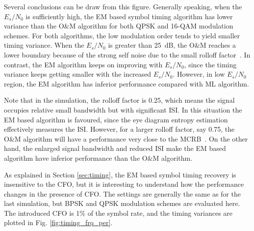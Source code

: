 \documentclass[journal,comsoc,onecolumn, 12pt,draftclsnofoot]{IEEEtran}
\begin{document}
Several conclusions can be draw from this figure.
Generally speaking, when the  \(E_s/N_0\) is sufficiently high, the EM based symbol timing algorithm has lower variance than the O\&M algorithm for both QPSK and 16-QAM modulation schemes.
For both algorithms, the low modulation order tends to yield smaller timing variance.
When the \(E_s/N_0\) is greater than 25~dB, the O\&M reaches a lower boundary because of the strong self noise due to the small rolloff factor~\cite{mengali1997synchronization}. 
% 
% 
In contrast, the EM algorithm keeps on improving with \(E_s/N_0\), since the timing variance keeps getting smaller with the increased \(E_s/N_0\).
However, in low \(E_s/N_0\) region, the EM algorithm has inferior performance compared with ML algorithm.


Note that in the simulation, the rolloff factor is 0.25, which means the signal occupies relative small bandwidth but with significant ISI.
In this situation the EM based algorithm is favoured, since the eye diagram entropy estimation effectively measures the ISI.
However, for a larger rolloff factor, say 0.75, the O\&M algorithm will have a performance very close to the MCRB~\cite{mengali1997synchronization}.
% 
% 
On the other hand, the enlarged signal bandwidth and reduced ISI make the EM based algorithm have inferior performance than the O\&M algorithm.

As explained in Section \ref{sec:timing}, the EM based symbol timing recovery is insensitive to the CFO, but it is interesting to understand how the performance changes in the presence of CFO. 
The settings are generally the same as for the last simulation, but BPSK and QPSK modulation schemes are evaluated here.
The introduced CFO is 1\% of the symbol rate, and the timing variances are plotted in Fig. \ref{fig:timing_frq_per}.
\end{document}
